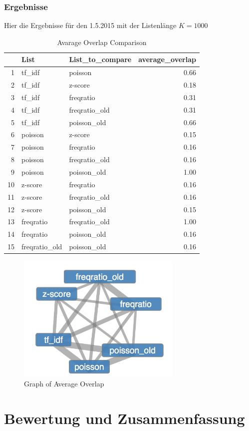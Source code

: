\subsection{Ergebnisse}
Hier die Ergebnisse f\"ur den 1.5.2015 mit der Listenl\"ange $K=1000$
\begin{table}[ht]
\centering
\begin{tabular}{rllr}
  \hline
 & List & List\_to\_compare & average\_overlap \\ 
  \hline
1 & tf\_idf & poisson & 0.66 \\ 
  2 & tf\_idf & z-score & 0.18 \\ 
  3 & tf\_idf & freqratio & 0.31 \\ 
  4 & tf\_idf & freqratio\_old & 0.31 \\ 
  5 & tf\_idf & poisson\_old & 0.66 \\ 
  6 & poisson & z-score & 0.15 \\ 
  7 & poisson & freqratio & 0.16 \\ 
  8 & poisson & freqratio\_old & 0.16 \\ 
  9 & poisson & poisson\_old & 1.00 \\ 
  10 & z-score & freqratio & 0.16 \\ 
  11 & z-score & freqratio\_old & 0.16 \\ 
  12 & z-score & poisson\_old & 0.15 \\ 
  13 & freqratio & freqratio\_old & 1.00 \\ 
  14 & freqratio & poisson\_old & 0.16 \\ 
  15 & freqratio\_old & poisson\_old & 0.16 \\ 
   \hline
\end{tabular}
\caption{Avarage Overlap Comparison} 
\label{AvarageOverlapComparison}
\end{table}\begin{figure}[htbp] 
  \centering
     \includegraphics[width=0.7\textwidth]{pictures/comparison.png}
  \caption{Graph of Average Overlap}
  \label{fig:comparisonGraph}
\end{figure}
 


\chapter{Bewertung und Zusammenfassung}











 
\nocite{*}%
 


